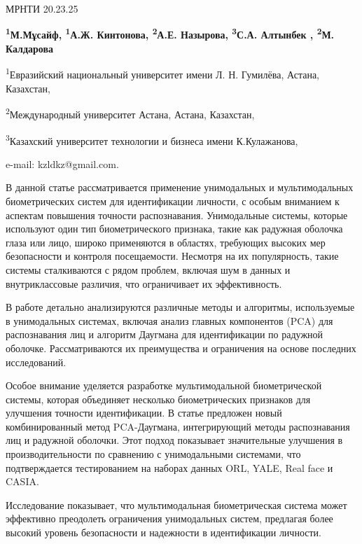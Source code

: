 МРНТИ 20.23.25


\begin{center}
{\bfseries \textsuperscript{1}М.Мұсайф, \textsuperscript{1}А.Ж. Кинтонова, \textsuperscript{2}А.Е. Назырова, \textsuperscript{3}С.А. Алтынбек , \textsuperscript{2}М. Калдарова}

\textsuperscript{1}Евразийский национальный университет имени Л. Н.
Гумилёва, Астана, Казахстан,

\textsuperscript{2}Международный университет Астана, Астана, Казахстан,

\textsuperscript{3}Казахский университет технологии и бизнеса имени
К.Кулажанова,

e-mail: kzldkz@gmail.com.
\end{center}

В данной статье рассматривается применение унимодальных и
мультимодальных биометрических систем для идентификации личности, с
особым вниманием к аспектам повышения точности распознавания.
Унимодальные системы, которые используют один тип биометрического
признака, такие как радужная оболочка глаза или лицо, широко применяются
в областях, требующих высоких мер безопасности и контроля посещаемости.
Несмотря на их популярность, такие системы сталкиваются с рядом проблем,
включая шум в данных и внутриклассовые различия, что ограничивает их
эффективность.

В работе детально анализируются различные методы и алгоритмы,
используемые в унимодальных системах, включая анализ главных компонентов
(PCA) для распознавания лиц и алгоритм Даугмана для идентификации по
радужной оболочке. Рассматриваются их преимущества и ограничения на
основе последних исследований.

Особое внимание уделяется разработке мультимодальной биометрической
системы, которая объединяет несколько биометрических признаков для
улучшения точности идентификации. В статье предложен новый
комбинированный метод PCA-Даугмана, интегрирующий методы распознавания
лиц и радужной оболочки. Этот подход показывает значительные улучшения в
производительности по сравнению с унимодальными системами, что
подтверждается тестированием на наборах данных ORL, YALE, Real face и
CASIA.

Исследование показывает, что мультимодальная биометрическая система
может эффективно преодолеть ограничения унимодальных систем, предлагая
более высокий уровень безопасности и надежности в идентификации
личности.

